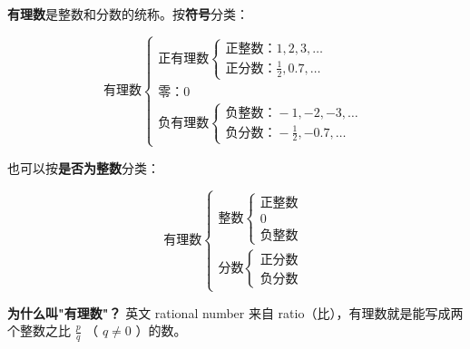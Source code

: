 \begin{understand}


\textbf{有理数}是整数和分数的统称。按\textbf{符号}分类：

\[
\text{有理数}\begin{cases}
\text{正有理数}\begin{cases} \text{正整数：} 1, 2, 3, \ldots \\ \text{正分数：} \frac{1}{2}, 0.7, \ldots \end{cases} \\[6pt]
\text{零：} 0 \\[6pt]
\text{负有理数}\begin{cases} \text{负整数：} -1, -2, -3, \ldots \\ \text{负分数：} -\frac{1}{2}, -0.7, \ldots \end{cases}
\end{cases}
\]


也可以按\textbf{是否为整数}分类：

\[
\text{有理数}\begin{cases}
\text{整数}\begin{cases} \text{正整数} \\ 0 \\ \text{负整数} \end{cases} \\[6pt]
\text{分数}\begin{cases} \text{正分数} \\ \text{负分数} \end{cases}
\end{cases}
\]


\textbf{为什么叫"有理数"？} 英文 rational number 来自 ratio（比），有理数就是能写成两个整数之比 $\frac{p}{q}$ （ $q \neq 0$ ）的数。

\end{understand}

